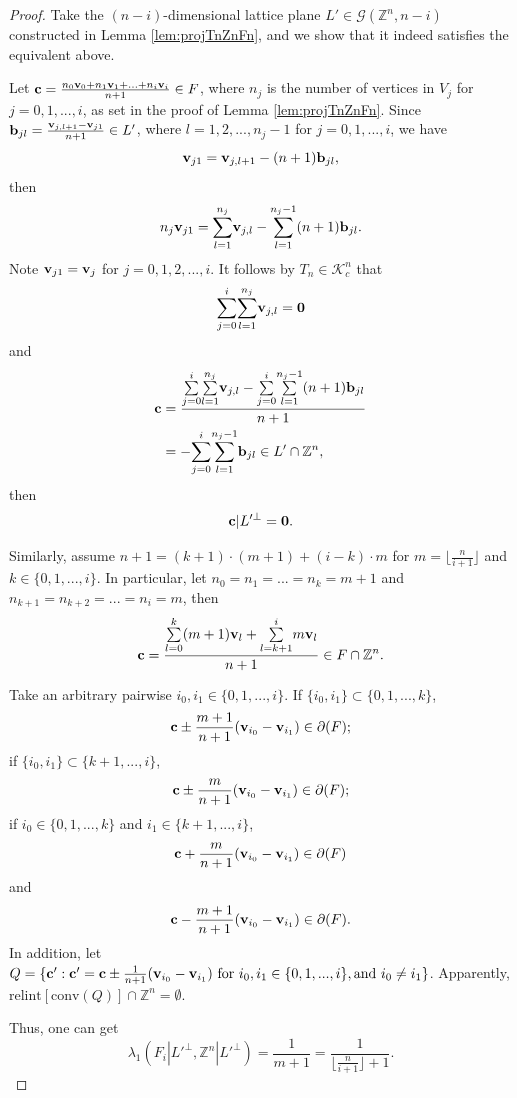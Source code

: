 \documentclass{amsart}
\theoremstyle{definition}
\theoremstyle{remark}
\numberwithin{equation}{section}
\begin{document}
\begin{proof}
   Take the $(n-i)$-dimensional lattice plane $L'\in\mathcal{G}(\mathbb{Z}^n,n-i)$ constructed in Lemma \ref{lem:projTnZnFn}, and we show that it indeed satisfies the equivalent above.

   Let ${\bf c}=\frac{n_0{\bf v}_0+n_1{\bf v}_1+\ldots+n_i{\bf v}_i}{n+1}\in F$, where $n_j$ is the number of vertices in $V_j$ for $j=0,1,...,i$, as set in the proof of Lemma \ref{lem:projTnZnFn}. Since ${\bf b}_{jl}=\frac{{\bf v}_{j,l+1}-{\bf v}_{j1}}{n+1}\in L'$, where $l=1,2,...,n_j-1$ for $j=0,1,...,i$, we have $${\bf v}_{j1}={\bf v}_{j,l+1}-(n+1){\bf b}_{jl},$$ then $$n_j{\bf v}_{j1}=\underset{l=1}{\overset{n_j}{\sum}}{\bf v}_{j,l}-\underset{l=1}{\overset{n_j-1}{\sum}}(n+1){\bf b}_{jl}.$$
Note ${\bf v}_{j1}={\bf v}_j$ for $j=0,1,2,...,i$. It follows by $T_n\in\mathcal{K}_c^n$ that
\begin{align*}
    \underset{j=0}{\overset{i}{\sum}}\underset{l=1}{\overset{n_j}{\sum}}{\bf v}_{j,l}={\bf 0}
\end{align*}
and
\begin{align*}
 {\bf c} & =\frac{\underset{j=0}{\overset{i}{\sum}}\underset{l=1}{\overset{n_j}{\sum}}{\bf v}_{j,l}-\underset{j=0}{\overset{i}{\sum}}\underset{l=1}{\overset{n_j-1}{\sum}}(n+1){\bf b}_{jl}}{n+1} \\
         &=-\underset{j=0}{\overset{i}{\sum}}\underset{l=1}{\overset{n_j-1}{\sum}}{\bf b}_{jl}\in L'\cap\mathbb{Z}^n,
\end{align*}
then
$${\bf c}|L'^\perp={\bf 0}.$$

Similarly, assume $n+1=(k+1)\cdot(m+1)+(i-k)\cdot m$ for $m=\lfloor\frac{n}{i+1}\rfloor$ and $k\in\{0,1,...,i\}$. In particular, let $n_0=n_1=...=n_k=m+1$ and $n_{k+1}=n_{k+2}=...=n_i=m$, then $${\bf c}=\frac{\overset{k}{\underset{l=0}{\sum}}(m+1){\bf v}_l+\overset{i}{\underset{l=k+1}{\sum}}m{\bf v}_l}{n+1}\in F\cap\mathbb{Z}^n.$$


Take an arbitrary pairwise $i_0,i_1\in\{0,1,...,i\}$. If $\{i_0,i_1\}\subset\{0,1,...,k\}$,
$${\bf c}\pm\frac{m+1}{n+1}({\bf v}_{i_0}-{\bf v}_{i_1})\in\partial(F);$$
if  $\{i_0,i_1\}\subset\{k+1,...,i\}$,
$${\bf c}\pm\frac{m}{n+1}({\bf v}_{i_0}-{\bf v}_{i_1})\in\partial(F);$$
if $i_0\in\{0,1,...,k\}$ and $i_1\in\{k+1,...,i\}$,
$${\bf c}+\frac{m}{n+1}({\bf v}_{i_0}-{\bf v}_{i_1})\in\partial(F)$$
and
$${\bf c}-\frac{m+1}{n+1}({\bf v}_{i_0}-{\bf v}_{i_1})\in\partial(F).$$
In addition, let $Q=\{{\bf c}':{\bf c}'={\bf c}\pm\frac1{n+1}({\bf v}_{i_0}-{\bf v}_{i_1})\text{ for }i_0,i_1\in\{0,1,...,i\},\text{and }i_0\not=i_1\}$. Apparently, $\text{relint}[\text{conv}(Q)]\cap\mathbb{Z}^n=\emptyset$.

Thus, one can get 
$$\lambda_1(F_i|L'^\perp,\mathbb{Z}^n|L'^\perp)=\frac1{m+1}=\frac1{\lfloor\frac{n}{i+1}\rfloor+1}.$$
\end{proof}
\end{document}
